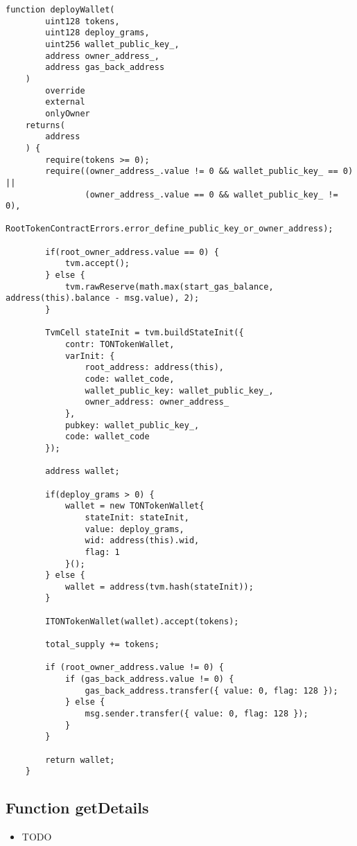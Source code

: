 \begin{lstlisting}[firstnumber=165]
    function deployWallet(
        uint128 tokens,
        uint128 deploy_grams,
        uint256 wallet_public_key_,
        address owner_address_,
        address gas_back_address
    )
        override
        external
        onlyOwner
    returns(
        address
    ) {
        require(tokens >= 0);
        require((owner_address_.value != 0 && wallet_public_key_ == 0) ||
                (owner_address_.value == 0 && wallet_public_key_ != 0),
                RootTokenContractErrors.error_define_public_key_or_owner_address);

        if(root_owner_address.value == 0) {
            tvm.accept();
        } else {
            tvm.rawReserve(math.max(start_gas_balance, address(this).balance - msg.value), 2);
        }

        TvmCell stateInit = tvm.buildStateInit({
            contr: TONTokenWallet,
            varInit: {
                root_address: address(this),
                code: wallet_code,
                wallet_public_key: wallet_public_key_,
                owner_address: owner_address_
            },
            pubkey: wallet_public_key_,
            code: wallet_code
        });

        address wallet;

        if(deploy_grams > 0) {
            wallet = new TONTokenWallet{
                stateInit: stateInit,
                value: deploy_grams,
                wid: address(this).wid,
                flag: 1
            }();
        } else {
            wallet = address(tvm.hash(stateInit));
        }

        ITONTokenWallet(wallet).accept(tokens);

        total_supply += tokens;

        if (root_owner_address.value != 0) {
            if (gas_back_address.value != 0) {
                gas_back_address.transfer({ value: 0, flag: 128 });
            } else {
                msg.sender.transfer({ value: 0, flag: 128 });
            }
        }

        return wallet;
    }
\end{lstlisting}

\subsection{Function getDetails}

\noindent\begin{itemize}
\item TODO
\end{itemize}


